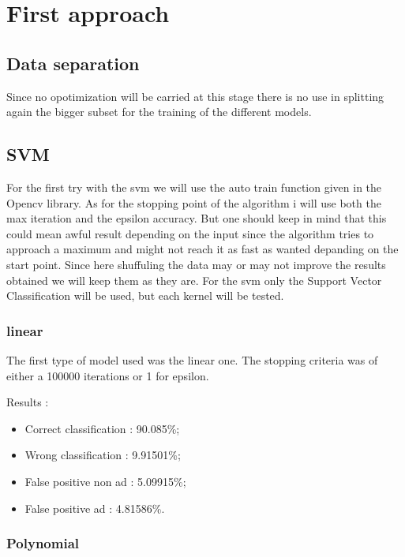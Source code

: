 \chapter{First approach}

\section{Data separation}

Since no opotimization will be carried at this stage there is no use in splitting again the bigger subset for the training of the different models.

\section{SVM}

For the first try with the svm we will use the auto train function given in the Opencv library. As for the stopping point of the algorithm i will use both the max iteration and the epsilon accuracy. But one should keep in mind that this could mean awful result depending on the input since the algorithm tries to approach a maximum and might not reach it as fast as wanted depanding on the start point. Since here shuffuling the data may or may not improve the results obtained we will keep them as they are.
For the svm only the Support Vector Classification will be used, but each kernel will be tested.


\subsection{linear}

The first type of model used was the linear one. The stopping criteria was of either a 100000 iterations or 1 for epsilon.

Results :
\begin{itemize}
  \item Correct classification : 90.085\%;
  \item Wrong classification : 9.91501\%;
  \item False positive non ad : 5.09915\%;
  \item False positive ad : 4.81586\%.
\end{itemize}


\subsection{Polynomial}

